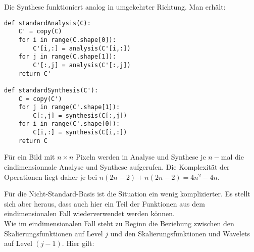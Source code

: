 \documentclass{article}
\begin{document}
\noindent Die Synthese funktioniert analog in umgekehrter Richtung. Man erhält:

\begin{verbatim}
def standardAnalysis(C):
    C' = copy(C)
    for i in range(C.shape[0]):
        C'[i,:] = analysis(C'[i,:])
    for j in range(C.shape[1]):
        C'[:,j] = analysis(C'[:,j])
    return C'

def standardSynthesis(C'):
    C = copy(C')
    for j in range(C'.shape[1]):
        C[:,j] = synthesis(C[:,j])
    for i in range(C'.shape[0]):
        C[i,:] = synthesis(C[i,:])
    return C
\end{verbatim}

\noindent Für ein Bild mit $n \times n$ Pixeln werden in Analyse und Synthese je $n-$mal die eindimensionnale Analyse und Synthese aufgerufen. Die Komplexität der Operationen liegt daher je bei $n(2n-2) + n(2n-2) = 4n^2-4n$.
 
\noindent Für die Nicht-Standard-Basis ist die Situation ein wenig komplizierter. Es stellt sich aber heraus, dass auch hier ein Teil der Funktionen aus dem eindimensionalen Fall wiederverwendet werden können.\\
Wie im eindimensionalen Fall steht zu Beginn die Beziehung zwischen den Skalierungsfunktionen auf Level $j$ und den Skalierungsfunktionen und Wavelets auf Level $(j-1)$. Hier gilt:

\end{document}
